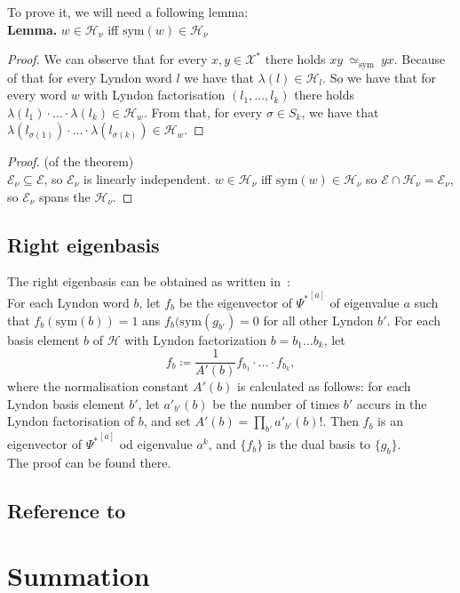 \documentclass[a4paper, 12pt]{article}
\newcommand{\SimeqSym}{{\simeq_\mathrm{sym}}}
\begin{document}
To prove it, we will need a following lemma: \\
\noindent \textbf{Lemma.} $w \in \mathcal{H}_\nu$ iff $\mathrm{sym}(w) \in \mathcal{H}_\nu$
\begin{proof}
We can observe that for every $x, y \in \mathcal{X}^*$ there holds $xy\ \SimeqSym\ yx$. Because of that
for every Lyndon word $l$ we have that $\lambda(l) \in \mathcal{H}_l$. So we have that for every word $w$
with Lyndon factorisation $(l_1,\dots, l_k)$ there holds
$\lambda(l_1)\cdot\ldots\cdot\lambda(l_k) \in \mathcal{H}_w$. From that, for every
$\sigma \in S_k$, we have that $\lambda(l_{\sigma(1)})\cdot\ldots\cdot\lambda(l_{\sigma(k)}) \in
\mathcal{H}_w$.

\end{proof}
\begin{proof}(of the theorem) \\
$\mathcal{E}_\nu \subseteq\mathcal{E}$,
so $\mathcal{E}_\nu$ is linearly independent. $w \in \mathcal{H}_\nu$ iff
$\mathrm{sym}(w) \in \mathcal{H}_\nu$ so $\mathcal{E} \cap \mathcal{H}_\nu = \mathcal{E}_\nu$, so
$\mathcal{E}_\nu$ spans the $\mathcal{H}_\nu$.
\end{proof}
\subsection{Right eigenbasis}
The right eigenbasis can be obtained as written in~\cite{Diaconis2014}: \\
For each Lyndon word $b$, let $f_b$ be the eigenvector of ${\Psi^*}^{[a]}$ of eigenvalue $a$ such that
$f_b(\mathrm{sym}(b))=1$ ans $f_b(\mathrm{sym}(g_{b'}) = 0$ for all other Lyndon $b'$. For each basis
element $b$ of $\mathcal{H}$ with Lyndon factorization $b=b_1\dots b_k$, let
\begin{equation*}
    f_b \coloneqq \frac{1}{A'(b)}f_{b_1}\cdot\ldots\cdot f_{b_k},
\end{equation*}
where the normalisation constant $A'(b)$ is calculated as follows: for each Lyndon basis element $b'$, let
$a'_{b'}(b)$ be the number of times $b'$ accurs in the Lyndon factorisation of $b$, and set $A'(b) =
\prod_{b'}a'_{b'}(b)!$. Then $f_b$ is an eigenvector of ${\Psi^*}^{[a]}$ od eigenvalue $a^k$, and $\{f_b\}$
is the dual basis to $\{g_b\}$. \\
The proof can be found there.
\subsection{Reference to~\cite{Diaconis2014}}

\section{Summation}
{}

\end{document}
